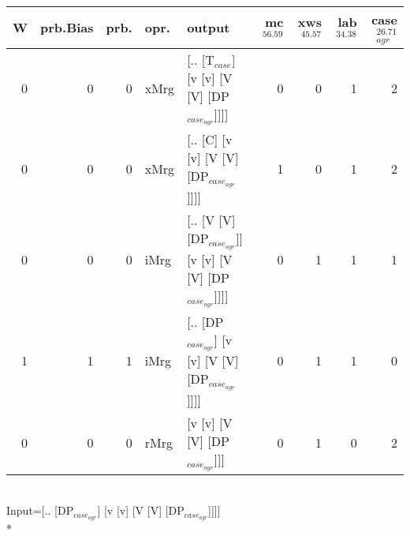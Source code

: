\begin{tabularx}{\linewidth}{rrrlXrrrr}
\hline
   W &   prb.Bias &   prb. & opr.   & output                                                   &   mc$^{56.59}$ &   xws$^{45.57}$ &   lab$^{34.38}$ &   case$_{agr}^{26.71}$ \\
\hline
   0 &       0 &   0 & xMrg & [.. [T$_{case}$] [v [v] [V [V] [DP$_{case_{agr}}$]]]]              &            0 &             0 &             1 &                  2 \\
   0 &       0 &   0 & xMrg & [.. [C] [v [v] [V [V] [DP$_{case_{agr}}$]]]]                   &            1 &             0 &             1 &                  2 \\
   0 &       0 &   0 & iMrg & [.. [V [V] [DP$_{case_{agr}}$]] [v [v] [V [V] [DP$_{case_{agr}}$]]]] &            0 &             1 &             1 &                  1 \\
   1 &       1 &   1 & iMrg & [.. [DP$_{case_{agr}}$] [v [v] [V [V] [DP$_{case_{agr}}$]]]]         &            0 &             1 &             1 &                  0 \\
   0 &       0 &   0 & rMrg & [v [v] [V [V] [DP$_{case_{agr}}$]]]                            &            0 &             1 &             0 &                  2 \\
\hline
\end{tabularx}\endgroup\\
\begingroup\scriptsize Input=[.. [DP$_{case_{agr}}$] [v [v] [V [V] [DP$_{case_{agr}}$]]]]\\*
